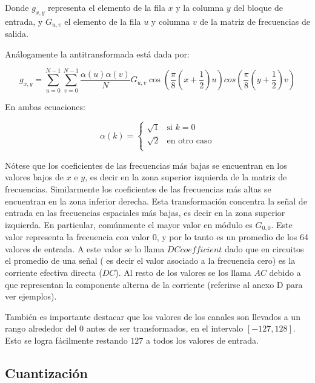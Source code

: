 \documentclass[%
final,
%
reprint,
%
notitlepage,
narroweqnarray,
inline,
twoside,
invited
]{ieee}
\begin{document}
Donde $g_{x, y}$ representa el elemento de la fila $x$ y la columna $y$ del bloque de entrada, y $G_{u, v}$ 
el elemento de la fila $u$ y columna $v$ de la matriz de frecuencias de salida.

Análogamente la antitransformada está dada por:

\begin{equation}
	g_{x, y} = \sum^{N-1}_{u=0}\sum^{N-1}_{v=0}\frac{\alpha(u)\alpha(v)}{N}G_{u, v}\cos(\frac{\pi}{8}(x+\frac{1}{2})u)cos(\frac{\pi}{8}(y+\frac{1}{2})v)
\end{equation}

En ambas ecuaciones:

\begin{equation}
	\alpha(k) = \left \{
		\begin{array}{rl}
			\sqrt{1} & \mbox{si } k = 0 \\ 
			\sqrt{2} & \mbox{en otro caso} \\
		\end{array}
		\right.
\end{equation}

\par Nótese que los coeficientes de las frecuencias más bajas se encuentran en los valores bajos de $x$ e $y$, 
es decir en la zona superior 
izquierda de la matriz de frecuencias. Similarmente los coeficientes de las frecuencias más altas se encuentran 
en la zona inferior derecha. Esta transformación concentra la señal de entrada en las frecuencias espaciales más bajas, 
es decir en la zona superior izquierda. En particular, comúnmente el mayor valor en módulo es $G_{0,0}$. 
Este valor representa la frecuencia con valor 0, y por lo tanto es un promedio de los 64 valores de entrada. A este 
valor se lo llama $DC coefficient$ dado que en circuitos el promedio de una señal ( es decir el valor asociado 
a la frecuencia cero) es la corriente efectiva directa ($DC$). Al resto de los valores se los llama $AC$ debido 
a que representan la componente alterna de la corriente (referirse al anexo D para ver ejemplos).


\par También es importante destacar que los valores de los canales son llevados a un rango 
alrededor del $0$ antes de ser transformados, en el intervalo $[-127,128]$. Esto se logra fácilmente restando 
$127$ a todos los valores de entrada.

\subsection{Cuantización}
\end{document}

